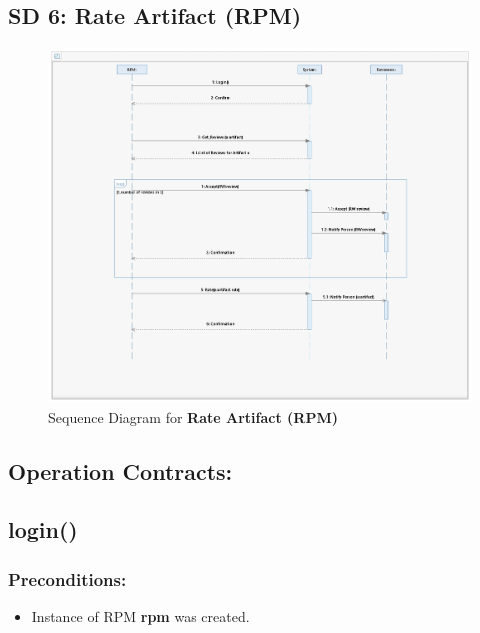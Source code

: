 \newpage



\subsection*{SD 6: Rate Artifact (RPM)}

\begin{figure}[h]
\includegraphics[width=16cm]{SD_RateArtifact.jpeg}
\centering
\caption{Sequence Diagram for \textbf{Rate Artifact (RPM)}}
\end{figure}








\subsection*{Operation Contracts:}
\subsection*{login()}

\subsubsection*{Preconditions:}
\begin{itemize}
\itemsep-1.5em 
    \item Instance of RPM \textbf{rpm} was created.
    
  
   
\end{itemize}



